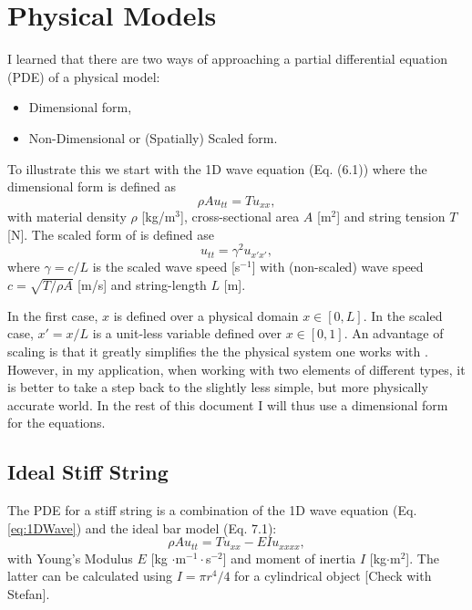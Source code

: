 \documentclass{article}
\begin{document}
\section{Physical Models}
I learned that there are two ways of approaching a partial differential equation (PDE) of a physical model:
\begin{itemize} 
    \item Dimensional form,
    \item Non-Dimensional or (Spatially) Scaled form.
\end{itemize}
To illustrate this we start with the 1D wave equation (Eq. (6.1)) where the dimensional form is defined as
\begin{equation}\label{eq:1DWave}
    \rho A u_{tt} = T u_{xx}, 
\end{equation}
with material density $\rho$ [kg/m$^3$], cross-sectional area $A$ [m$^2$] and string tension $T$ [N].
The scaled form of is defined ase
\begin{equation}\label{eq:1DWaveScaled}
    u_{tt} = \gamma^2 u_{x'x'},
\end{equation}
where $\gamma = c/L$ is the scaled wave speed [s$^{-1}$] with (non-scaled) wave speed $c = \sqrt{T/\rho A}$ [m/s] and string-length $L$ [m].

In the first case, $x$ is defined over a physical domain $x\in[0,L]$. In the scaled case, $x' = x/L$ is a unit-less variable defined over $x\in[0,1]$. An advantage of scaling is that it greatly simplifies the the physical system one works with \cite{Bilbao2009}. However, in my application, when working with two  elements of different types, it is better to take a step back to the slightly less simple, but more physically accurate world. In the rest of this document I will thus use a dimensional form for the equations.

\subsection{Ideal Stiff String}
The PDE for a stiff string is a combination of the 1D wave equation (Eq. \eqref{eq:1DWave}) and the ideal bar model (Eq. 7.1):
\begin{equation}\label{eq:stiffStringPDE}
    \rho A u_{tt} = T u_{xx} - EI u_{xxxx},
\end{equation}
with Young's Modulus $E$ [kg $\cdot$m$^{-1} \cdot$s$^{-2}$] and moment of inertia $I$ [kg$\cdot$m$^2$]. The latter can be calculated using $I = \pi r^4/4$ for a cylindrical object [Check with Stefan].
\end{document}
